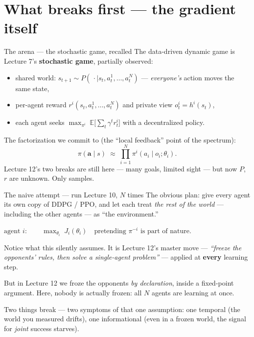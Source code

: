 \documentclass[10pt, aspectratio=169]{beamer}
\begin{document}
\section{What breaks first --- the gradient itself}

\begin{frame}{The arena --- the stochastic game, recalled}
The data-driven dynamic game is Lecture 7's \textbf{stochastic game}, partially observed:
\begin{itemize}\setlength\itemsep{2pt}
\item shared world: $s_{t+1} \sim P(\,\cdot \mid s_t, a^1_t, \dots, a^N_t)$ --- \emph{everyone's} action moves the same state,
\item per-agent reward $r^i(s_t, a^1_t,\dots,a^N_t)$ and private view $o^i_t = h^i(s_t)$,
\item each agent seeks $\max_{\pi^i} \; \mathbb{E}\big[\sum_t \gamma^t r^i_t\big]$ with a \alert{decentralized} policy.
\end{itemize}
\medskip

\pause
The factorization we commit to (the ``local feedback'' point of the spectrum):
\[
\pi(\mathbf{a}\mid s) \;\approx\; \prod_{i=1}^{N} \pi^i(a_i \mid o_i;\theta_i).
\]
\medskip
\pause
Lecture 12's two breaks are still here --- many goals, limited sight --- but now \alert{$P$, $r$ are unknown}. Only samples.
\end{frame}

\begin{frame}{The naive attempt --- run Lecture 10, $N$ times}
The obvious plan: give every agent its own copy of DDPG / PPO, and let each treat \emph{the rest of the world} --- including the other agents --- as ``the environment.''
\medskip

\begin{center}
\alert{$\text{agent } i:\qquad \max_{\theta_i}\; J_i(\theta_i)\quad \text{pretending } \pi^{-i} \text{ is part of nature.}$}
\end{center}
\medskip

\pause
Notice what this silently assumes. It is Lecture 12's master move --- \emph{``freeze the opponents' rules, then solve a single-agent problem''} --- applied at \textbf{every} learning step.
\medskip

\pause
But in Lecture 12 we froze the opponents \emph{by declaration}, inside a fixed-point argument. Here, \alert{nobody is actually frozen}: all $N$ agents are learning at once.
\medskip

Two things break --- two symptoms of that one assumption: one \alert{temporal} (the world you measured drifts), one \alert{informational} (even in a frozen world, the signal for \emph{joint} success starves).
\end{frame}
\end{document}
